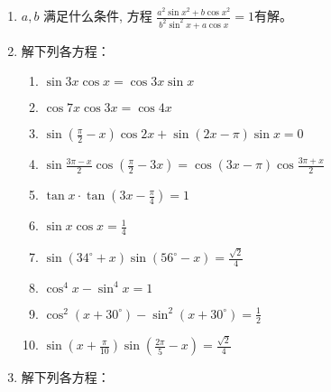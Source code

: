 \begin{enumerate}
\item $a, b$ 满足什么条件, 方程
$
\frac{a^{2} \sin x^{2}+b \cos x^{2}}{b^{2} \sin ^{2} x+a \cos x}=1
$有解。
\item 解下列各方程：
\begin{enumerate}
\item $\sin 3 x \cos x=\cos 3 x \sin x$
\item $\cos 7 x \cos 3 x=\cos 4 x$
\item $\sin \left(\frac{\pi}{2}-x\right) \cos 2 x+\sin (2 x-\pi) \sin x=0$
\item  $\sin \frac{3 \pi-x}{2} \cos \left(\frac{\pi}{2}-3 x\right) =\cos (3 x-\pi) \cos \frac{3 \pi+x}{2}$
\item $\tan x\cdot \tan\left(3x-\frac{\pi}{4}\right)=1$
\item $\sin x\cos x=\frac{1}{4}$
\item $\sin(34^{\circ}+x)\sin(56^{\circ}-x)=\frac{\sqrt{2}}{4}$
\item $\cos^4x-\sin^4x=1$
\item $\cos ^{2}\left(x+30^{\circ}\right)-\sin ^{2}\left(x+30^{\circ}\right)=\frac{1}{2}$
\item $\sin \left(x+\frac{\pi}{10}\right) \sin \left(\frac{2 \pi}{5}-x\right)=\frac{\sqrt{2}}{4}$
\end{enumerate}

\item 解下列各方程：


\end{enumerate}
